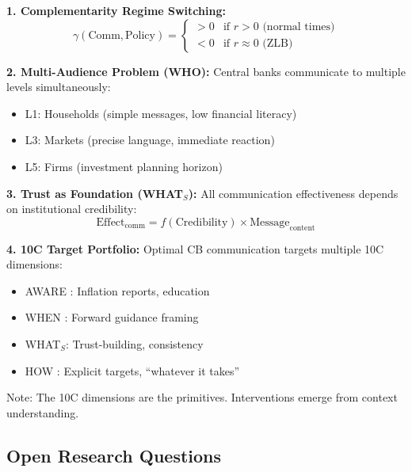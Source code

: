 \begin{tcolorbox}[colback=green!5!white, colframe=green!75!black,
    title=EBF Integration: Central Bank Communication]

\textbf{1. Complementarity Regime Switching:}
\begin{equation}
\gamma(\text{Comm}, \text{Policy}) =
\begin{cases}
> 0 & \text{if } r > 0 \text{ (normal times)} \\
< 0 & \text{if } r \approx 0 \text{ (ZLB)}
\end{cases}
\end{equation}

\textbf{2. Multi-Audience Problem (WHO):}
Central banks communicate to multiple levels simultaneously:
\begin{itemize}[nosep]
  \item L1: Households (simple messages, low financial literacy)
  \item L3: Markets (precise language, immediate reaction)
  \item L5: Firms (investment planning horizon)
\end{itemize}

\textbf{3. Trust as Foundation (WHAT$_S$):}
All communication effectiveness depends on institutional credibility:
\begin{equation}
\text{Effect}_{\text{comm}} = f(\text{Credibility}) \times \text{Message}_{\text{content}}
\end{equation}

\textbf{4. 10C Target Portfolio:}
Optimal CB communication targets multiple 10C dimensions:
\begin{itemize}[nosep]
  \item AWARE : Inflation reports, education
  \item WHEN : Forward guidance framing
  \item WHAT$_S$: Trust-building, consistency
  \item HOW : Explicit targets, ``whatever it takes''
\end{itemize}
Note: The 10C dimensions are the primitives. Interventions emerge from context understanding.

\end{tcolorbox}

\subsection{Open Research Questions}

